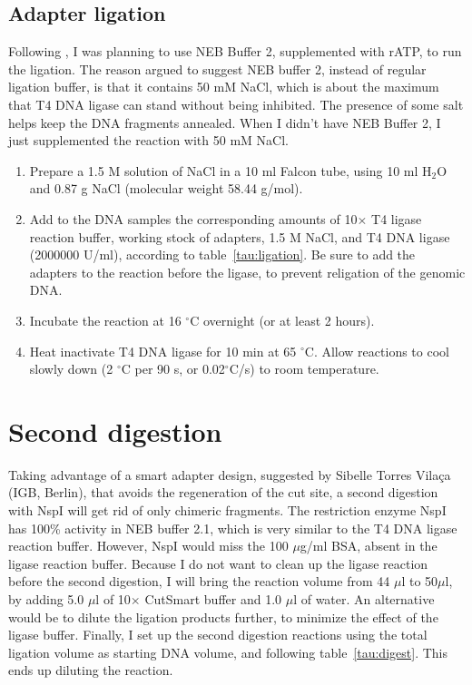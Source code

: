 \documentclass[a4paper,12pt]{article}
\begin{document}
\subsection{Adapter ligation}
Following \cite{Etter2011}, I was planning to use NEB Buffer 2, supplemented with rATP, to run the ligation.  The reason argued to suggest NEB buffer 2, instead of regular ligation buffer, is that it contains 50 mM NaCl, which is about the maximum that T4 DNA ligase can stand without being inhibited. The presence of some salt helps keep the DNA fragments annealed. When I didn't have NEB Buffer 2, I just supplemented the reaction with 50 mM NaCl.
\begin{enumerate}
\item Prepare a 1.5 M solution of NaCl in a 10 ml Falcon tube, using 10 ml H$_2$O and 0.87 g NaCl (molecular weight 58.44 g/mol).
\item Add to the DNA samples the corresponding amounts of 10$\times$ T4 ligase reaction buffer, working stock of adapters, 1.5 M NaCl, and T4 DNA ligase (2000000 U/ml), according to table~\ref{tau:ligation}. Be sure to add the adapters to the reaction before the ligase, to prevent religation of the genomic DNA.
\item Incubate the reaction at 16 $^{\circ}$C overnight (or at least 2 hours).
\item Heat inactivate T4 DNA ligase for 10 min at 65 $^{\circ}$C. Allow reactions to cool slowly down (2 $^{\circ}$C per 90 s, or 0.02$^{\circ}$C/s) to room temperature.
\end{enumerate}

\section{Second digestion}
Taking advantage of a smart adapter design, suggested by Sibelle Torres Vilaça (IGB, Berlin), that avoids the regeneration of the cut site, a second digestion with NspI will get rid of only chimeric fragments. The restriction enzyme NspI has 100\% activity in NEB buffer 2.1, which is very similar to the T4 DNA ligase reaction buffer. However, NspI would miss the 100 $\mu$g/ml BSA, absent in the ligase reaction buffer. Because I do not want to clean up the ligase reaction before the second digestion, I will bring the reaction volume from 44 $\mu$l to 50$\mu$l, by adding 5.0 $\mu$l of 10$\times$ CutSmart buffer and 1.0 $\mu$l of water. An alternative would be to dilute the ligation products further, to minimize the effect of the ligase buffer. Finally, I set up the second digestion reactions using the total ligation volume as starting DNA volume, and following table~\ref{tau:digest}. This ends up diluting the reaction.
\end{document}
